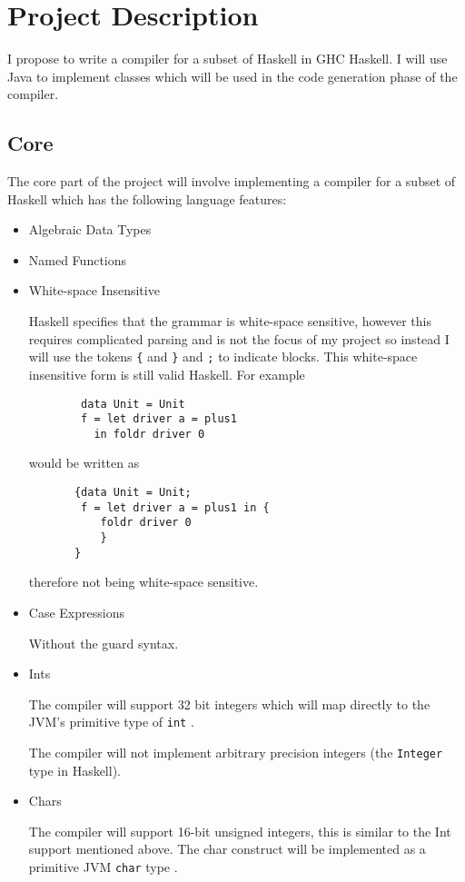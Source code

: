\documentclass[12pt,a4paper,twoside]{article}
\begin{document}
\section*{Project Description}
  I propose to write a compiler for a subset of Haskell in GHC Haskell. I will use Java to implement classes which will be used in the
  code generation phase of the compiler.

  \subsection*{Core}

  The core part of the project will involve implementing a compiler for a subset of Haskell which has the following language features:
  \begin{itemize}
    \item Algebraic Data Types

    \item Named Functions


    \item White-space Insensitive

      Haskell specifies that the grammar is white-space sensitive, however this requires complicated parsing and is not the focus of my project so instead I will
      use the tokens \texttt{\{} and \texttt{\}} and \texttt{;} to indicate blocks. This white-space insensitive form is still valid Haskell.
      For example
      \begin{verbatim}
        data Unit = Unit
        f = let driver a = plus1
          in foldr driver 0
      \end{verbatim}
      would be written as
      \begin{verbatim}
       {data Unit = Unit;
        f = let driver a = plus1 in {
           foldr driver 0
           }
       }
      \end{verbatim}
      therefore not being white-space sensitive.

    \item Case Expressions

      Without the guard syntax.

    \item Ints

      The compiler will support 32 bit integers which will map directly to the JVM's primitive type of \texttt{int} \cite{jvm-spec8}.

      The compiler will not implement arbitrary precision integers (the \texttt{Integer} type in Haskell).

    \item Chars

      The compiler will support 16-bit unsigned integers, this is similar to the Int support mentioned above. The char construct will be implemented as a
      primitive JVM \texttt{char} type \cite{jvm-spec8}.


  \end{itemize}
\end{document}
